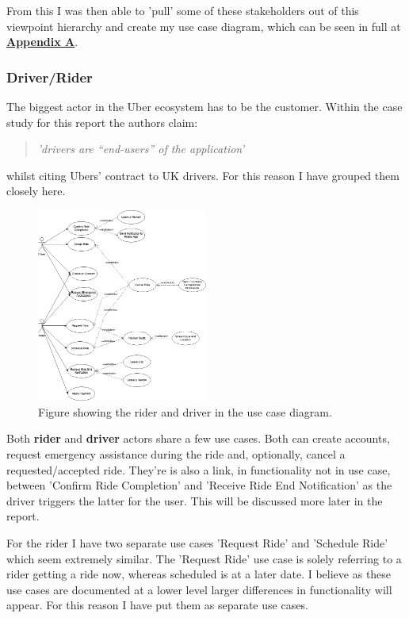 \documentclass{article}
\begin{document}
    From this I was then able to 'pull' some of these stakeholders out of this viewpoint hierarchy and create my use case diagram, which can be seen in full at \hyperref[sec:AppendixA]{\textbf{Appendix A}}.
    
    \newpage
    \subsubsection{Driver/Rider}
    The biggest actor in the Uber ecosystem has to be the customer. Within the case study for this report the authors claim:
    \begin{quote}
      \textit{'drivers are “end-users” of the application'}
    \end{quote}
    whilst citing Ubers' contract to UK drivers. For this reason I have grouped them closely here.

    \begin{figure}[H]
      \centering
      \includegraphics[width=0.5\textwidth]{assets/customer_use_case.drawio.png}
      \caption{Figure showing the rider and driver in the use case diagram.}
      \label{fig:customerUseCase}
    \end{figure}

    Both \textbf{rider} and \textbf{driver} actors share a few use cases. Both can create accounts, request emergency assistance during the ride and,
    optionally, cancel a requested/accepted ride. They're is also a link, in functionality not in use case, between 'Confirm Ride Completion' and 
    'Receive Ride End Notification' as the driver triggers the latter for the user. This will be discussed more later in the report.

    For the rider I have two separate use cases 'Request Ride' and 'Schedule Ride' which seem extremely similar. The 'Request Ride' use case is solely 
    referring to a rider getting a ride now, whereas scheduled is at a later date. I believe as these use cases are documented at a lower level larger 
    differences in functionality will appear. For this reason I have put them as separate use cases.
\end{document}

